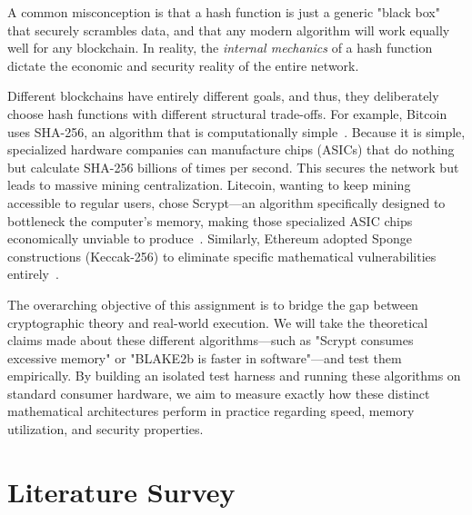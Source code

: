 \documentclass[11pt,a4paper,oneside]{book}
\begin{document}
A common misconception is that a hash function is just a generic "black box" that securely scrambles data, and that any modern algorithm will work equally well for any blockchain. In reality, the \textit{internal mechanics} of a hash function dictate the economic and security reality of the entire network.

Different blockchains have entirely different goals, and thus, they deliberately choose hash functions with different structural trade-offs. For example, Bitcoin uses SHA-256, an algorithm that is computationally simple~\cite{nakamoto2008bitcoin}. Because it is simple, specialized hardware companies can manufacture chips (ASICs) that do nothing but calculate SHA-256 billions of times per second. This secures the network but leads to massive mining centralization. Litecoin, wanting to keep mining accessible to regular users, chose Scrypt---an algorithm specifically designed to bottleneck the computer's memory, making those specialized ASIC chips economically unviable to produce~\cite{percival2009scrypt}. Similarly, Ethereum adopted Sponge constructions (Keccak-256) to eliminate specific mathematical vulnerabilities entirely~\cite{wood2014ethereum}.

The overarching objective of this assignment is to bridge the gap between cryptographic theory and real-world execution. We will take the theoretical claims made about these different algorithms---such as "Scrypt consumes excessive memory" or "BLAKE2b is faster in software"---and test them empirically. By building an isolated test harness and running these algorithms on standard consumer hardware, we aim to measure exactly how these distinct mathematical architectures perform in practice regarding speed, memory utilization, and security properties.


\chapter{Literature Survey}
\end{document}

